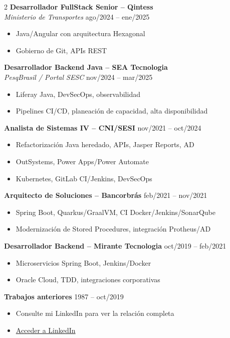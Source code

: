 \documentclass[a4paper,11pt]{article}
\begin{document}
\begin{paracol}{2}
\textbf{Desarrollador FullStack Senior – Qintess} \\
\textit{Ministerio de Transportes}
\hfill ago/2024 – ene/2025
\begin{itemize}
    \item Java/Angular con arquitectura Hexagonal
    \item Gobierno de Git, APIs REST
\end{itemize}

\textbf{Desarrollador Backend Java – SEA Tecnologia} \\
\textit{PesqBrasil / Portal SESC}
\hfill nov/2024 – mar/2025
\begin{itemize}
    \item Liferay Java, DevSecOps, observabilidad
    \item Pipelines CI/CD, planeación de capacidad, alta disponibilidad
\end{itemize}

\textbf{Analista de Sistemas IV – CNI/SESI} \hfill nov/2021 – oct/2024
\begin{itemize}
    \item Refactorización Java heredado, APIs, Jasper Reports, AD
    \item OutSystems, Power Apps/Power Automate
    \item Kubernetes, GitLab CI/Jenkins, DevSecOps
\end{itemize}

\textbf{Arquitecto de Soluciones – Bancorbrás} \hfill feb/2021 – nov/2021
\begin{itemize}
    \item Spring Boot, Quarkus/GraalVM, CI Docker/Jenkins/SonarQube
    \item Modernización de Stored Procedures, integración Protheus/AD
\end{itemize}

\textbf{Desarrollador Backend – Mirante Tecnologia} \hfill oct/2019 – feb/2021
\begin{itemize}
    \item Microservicios Spring Boot, Jenkins/Docker
    \item Oracle Cloud, TDD, integraciones corporativas
\end{itemize}

\textbf{Trabajos anteriores} \hfill 1987 – oct/2019
\begin{itemize}
	\item Consulte mi LinkedIn para ver la relación completa
	\item \href{https://www.linkedin.com/in/fernando-anselmo-bb423623/}{Acceder a LinkedIn}
\end{itemize}

\end{paracol}
\end{document}

